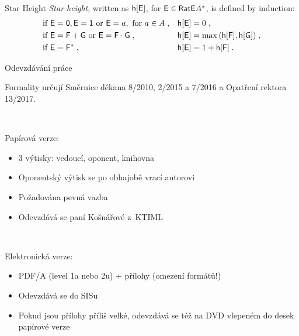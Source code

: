 \documentclass{beamer}
\begin{document}
\begin{frame}{Star Height}
      \emph{Star height}, written as ${\mathsf{h}[{\mathsf{E}}]}$, for ${\mathsf{E}} \in {\mathsf{RatE}} A^*$, is defined by induction:
      \begin{align*}
          &\text{if } {\mathsf{E}} = {\mathsf{0}}, {\mathsf{E}} = {\mathsf{1}} \text{ or } {\mathsf{E}} = a, \text{ for } a \in A \; , & &{\mathsf{h}[{\mathsf{E}}]} = 0 \; , \\
          &\text{if } {\mathsf{E}} = {\mathsf{F}} + {\mathsf{G}} \text{ or } {\mathsf{E}} = {\mathsf{F}} \cdot {\mathsf{G}}\; , & &{\mathsf{h}[{\mathsf{E}}]} = \max{({\mathsf{h}[{\mathsf{F}}]}, {\mathsf{h}[{\mathsf{G}}]})} \; , \\
          &\text{if } {\mathsf{E}} = {\mathsf{F}}^* \; , & &{\mathsf{h}[{\mathsf{E}}]} = 1 + {\mathsf{h}[{\mathsf{F}}]} \; .
      \end{align*}
\end{frame}

\begin{frame}{Odevzdávání práce}

Formality určují Směrnice děkana 8/2010, 2/2015 a 7/2016
a Opatření rektora 13/2017.

~

Papírová verze:

\begin{itemize}
\item 3 výtisky: vedoucí, oponent, knihovna
\item Oponentský výtisk se po obhajobě vrací autorovi
\item Požadována pevná vazba
\item Odevzdává se paní Košnářové z~KTIML
\end{itemize}

~

Elektronická verze:

\begin{itemize}
\item PDF/A (level 1a nebo 2u) + přílohy (omezení formátů!)
\item Odevzdává se do SISu
\item Pokud jsou přílohy příliš velké, odevzdává se též
      na DVD vlepeném do desek papírové verze
\end{itemize}

\end{frame}
\end{document}
